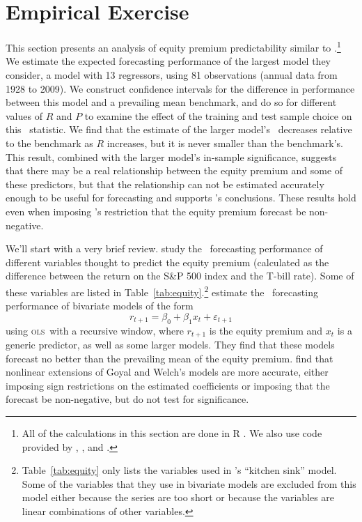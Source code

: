 \documentclass[11pt]{article}
\newcommand{\citepos}[1]{\citeauthor{#1}'s \citeyearpar{#1}}
\newcommand{\ols}{\textsc{ols}}
\begin{document}
\section{Empirical Exercise}\label{sec:empirics}
This section presents an analysis of equity premium predictability
similar to \citet{goyal-welch-2008-rfs}.\footnote{All of the
  calculations in this section are done in R \citep{rproject}.  We
  also use code provided by \citet{zeileis-hothorn-2002-RNews},
  \citet{zeileis-2004-JStatSoftware}, and \citet{harrell-2010-R}.}  We
estimate the expected forecasting performance of the largest model
they consider, a model with 13 regressors, using 81 observations
(annual data from 1928 to 2009).  We construct confidence intervals
for the difference in performance between this model and a prevailing
mean benchmark, and do so for different values of $R$ and $P$ to
examine the effect of the training and test sample choice on this
\oos\ statistic.  We find that the estimate of the larger model's
\mse\ decreases relative to the benchmark as $R$ increases, but it is
never smaller than the benchmark's.  This result, combined with the
larger model's in-sample significance, suggests that there may be a
real relationship between the equity premium and some of these
predictors, but that the relationship can not be estimated accurately
enough to be useful for forecasting and supports
\citepos{goyal-welch-2008-rfs} conclusions.  These results hold even
when imposing \citepos{campbell-thompson-2008-rfs} restriction that
the equity premium forecast be non-negative.

We'll start with a very brief review.  \citet{goyal-welch-2008-rfs}
study the \oos\ forecasting performance of different variables thought
to predict the equity premium (calculated as the difference between
the return on the S\&P 500 index and the T-bill rate).  Some of these
variables are listed in
Table~\ref{tab:equity}.\footnote{Table~\ref{tab:equity} only lists the
  variables used in \citepos{goyal-welch-2008-rfs} ``kitchen sink''
  model.  Some of the variables that they use in bivariate models are
  excluded from this model either because the series are too short or
  because the variables are linear combinations of other variables.}
\citet{goyal-welch-2008-rfs} estimate the \oos\ forecasting
performance of bivariate models of the form
\[
r_{t+1} = \beta_0 + \beta_1 x_t + \varepsilon_{t+1}
\]
using \ols\ with a recursive window, where $r_{t+1}$ is the equity
premium and $x_t$ is a generic predictor, as well as some larger
models.  They find that these models forecast no better than the
prevailing mean of the equity premium.
\citet{campbell-thompson-2008-rfs} find that nonlinear extensions of
Goyal and Welch's models are more accurate, either imposing sign
restrictions on the estimated coefficients or imposing that the
forecast be non-negative, but do not test for significance.
\end{document}
